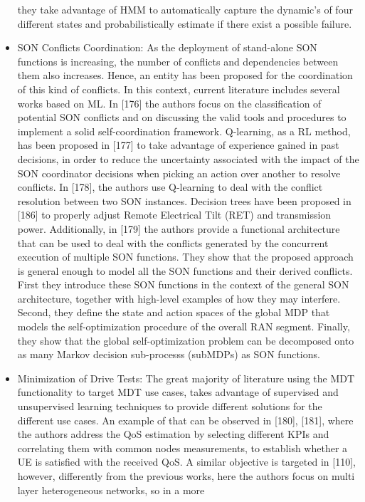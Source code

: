 \documentclass[12pt]{article}
\begin{document}
\begin{itemize}
	they take advantage of HMM to automatically capture the
	dynamic’s of four different states and probabilistically estimate
	if there exist a possible failure.
	\item SON Conflicts Coordination: As the deployment of
	stand-alone SON functions is increasing, the number of conflicts
	and dependencies between them also increases. Hence,
	an entity has been proposed for the coordination of this kind
	of conflicts. In this context, current literature includes several
	works based on ML. In [176] the authors focus on the classification
	of potential SON conflicts and on discussing the valid
	tools and procedures to implement a solid self-coordination
	framework. Q-learning, as a RL method, has been proposed
	in [177] to take advantage of experience gained in past
	decisions, in order to reduce the uncertainty associated with
	the impact of the SON coordinator decisions when picking an
	action over another to resolve conflicts. In [178], the authors
	use Q-learning to deal with the conflict resolution between
	two SON instances. Decision trees have been proposed in
	[186] to properly adjust Remote Electrical Tilt (RET) and
	transmission power. Additionally, in [179] the authors provide
	a functional architecture that can be used to deal with the
	conflicts generated by the concurrent execution of multiple
	SON functions. They show that the proposed approach is
	general enough to model all the SON functions and their
	derived conflicts. First they introduce these SON functions
	in the context of the general SON architecture, together with
	high-level examples of how they may interfere. Second, they
	define the state and action spaces of the global MDP that
	models the self-optimization procedure of the overall RAN
	segment. Finally, they show that the global self-optimization
	problem can be decomposed onto as many Markov decision
	sub-processs (subMDPs) as SON functions.
	\item Minimization of Drive Tests: The great majority of
	literature using the MDT functionality to target MDT use
	cases, takes advantage of supervised and unsupervised learning
	techniques to provide different solutions for the different use
	cases. An example of that can be observed in [180], [181],
	where the authors address the QoS estimation by selecting
	different KPIs and correlating them with common nodes
	measurements, to establish whether a UE is satisfied with
	the received QoS. A similar objective is targeted in [110],
	however, differently from the previous works, here the authors
	focus on multi layer heterogeneous networks, so in a more

\end{itemize}
\end{document}
